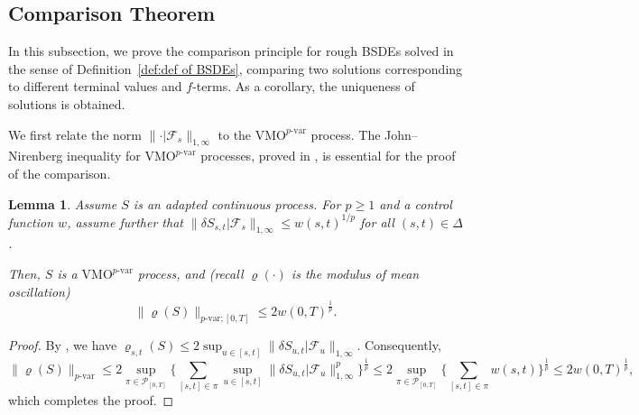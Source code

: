 \documentclass[11pt,reqno]{amsart}
\newtheorem{lemma}{Lemma}[section]
\numberwithin{equation}{section}
\begin{document}
\subsection{Comparison Theorem}\label{subsec:comparison}
In this subsection, we prove the comparison principle for rough BSDEs solved in the sense of Definition~\ref{def:def of BSDEs}, comparing two solutions corresponding to different terminal values and $f$-terms. As a corollary, the uniqueness of solutions is obtained.  

We first relate the norm $\|\bm\cdot| \mathcal F_s\|_{1,\infty}$ to the $\mathrm{VMO}^{p\text{-}\mathrm{var}}$ process. The John--Nirenberg inequality for $\mathrm{VMO}^{p\text{-}\mathrm{var}}$ processes, proved in \cite{le2022quantitative}, is essential for the proof of the comparison.   

\begin{lemma}\label{lem:cond for VMO process}
Assume $S$ is an adapted continuous process. For $p \ge 1$ and a control function $w$, assume further that $\| \delta S_{s,t} | \mathcal F_{s} \|_{1,\infty} \le w(s,t)^{1/p}$ for all $(s,t) \in \Delta$. 

Then, $S$ is a $\mathrm{VMO}^{p\text{-}\mathrm{var}}$ process, and (recall $\varrho(\bm\cdot)$ is the modulus of mean oscillation)
\begin{equation*}
\|\varrho(S)\|_{p\text{-}\mathrm{var};[0,T]} \le 2 w(0,T)^{\frac{1}{p}}. 
\end{equation*}
\end{lemma}

\begin{proof}
By \cite[Proposition~2.2]{le2022quantitative}, we have $\varrho_{s,t}(S) \le 2 \sup_{u\in[s,t]} \| \delta S_{u,t} | \mathcal F_{u}\|_{1,\infty}$. Consequently, 
\begin{equation*}
\|\varrho(S)\|_{p\text{-}\mathrm{var}} \le 2 \sup_{\pi\in \mathcal P_{[0,T]}} \Big\{ \sum_{[s,t]\in\pi} \sup_{u\in[s,t]} \|\delta S_{u,t} | \mathcal F_{u}\|^{p}_{1,\infty} \Big\}^{\frac{1}{p}} \le 2 \sup_{\pi\in \mathcal P_{[0,T]}} \Big\{ \sum_{[s,t]\in\pi} w(s,t) \Big\}^{\frac{1}{p}} \le 2 w(0,T)^{\frac{1}{p}},
\end{equation*}
which completes the proof. 
\end{proof}
\end{document}

